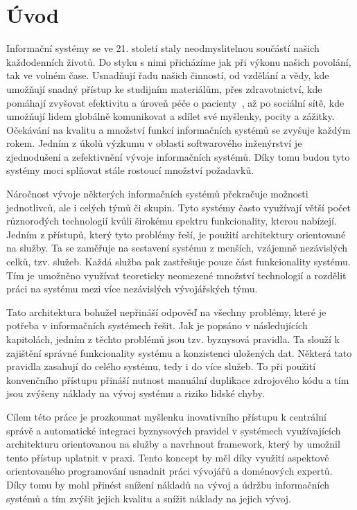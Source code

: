 
\chapter{Úvod}\label{ch:uvod}

Informační systémy se ve 21. století staly neodmyslitelnou součástí našich každodenních životů.
Do styku s nimi přicházíme jak při výkonu našich povolání, tak ve volném čase. Usnadňují
řadu našich činností, od vzdělání a vědy, kde umožňují snadný přístup ke studijním materiálům,
přes zdravotnictví, kde pomáhají zvyšovat efektivitu a úroveň péče o pacienty~\cite{fichman2011editorial},
až po sociální sítě, kde umožňují lidem globálně komunikovat a sdílet své myšlenky, pocity a zážitky.
Očekávání na kvalitu a množství funkcí informačních systémů se zvyšuje každým rokem.
Jedním z úkolů výzkumu v oblasti softwarového inženýrství je zjednodušení a zefektivnění
vývoje informačních systémů. Díky tomu budou tyto systémy moci splňovat stále rostoucí množství požadavků.

Náročnost vývoje některých informačních systémů překračuje možnosti jednotlivců, ale
i celých týmů či skupin. Tyto systémy často využívají větší počet různorodých technologií kvůli
širokému spektru funkcionality, kterou nabízejí. Jedním z přístupů, který tyto problémy řeší,
je použití architektury orientované na služby. Ta se zaměřuje na sestavení systému z menších, vzájemně
nezávislých celků, tzv. služeb. Každá služba pak zastřešuje pouze část funkcionality systému.
Tím je umožněno využívat teoreticky neomezené množství technologií a rozdělit práci na systému mezi více nezávislých
vývojářských týmu.

Tato architektura bohužel nepřináší odpověď na všechny problémy, které je potřeba v informačních
systémech řešit. Jak je popsáno v následujících kapitolách, jedním z těchto problémů jsou tzv. byznysová
pravidla. Ta slouží k zajištění správné funkcionality systému a konzistenci uložených dat.
Některá tato pravidla zasahují do celého systému, tedy i do více služeb.
To při použití konvenčního přístupu přináší nutnost manuální duplikace zdrojového
kódu a tím jsou zvýšeny náklady na vývoj systému a riziko lidské chyby.

Cílem této práce je prozkoumat myšlenku inovativního přístupu k centrální správě a automatické
integraci byznysových pravidel v systémech využívajících architekturu orientovanou na služby
a navrhnout framework, který by umožnil tento přístup uplatnit v praxi.
Tento koncept by měl díky využití aspektově orientovaného programování usnadnit práci vývojářů
a doménových expertů. Díky tomu by mohl přinést snížení nákladů na vývoj a údržbu informačních systémů
a tím zvýšit jejich kvalitu a snížit náklady na jejich vývoj.

